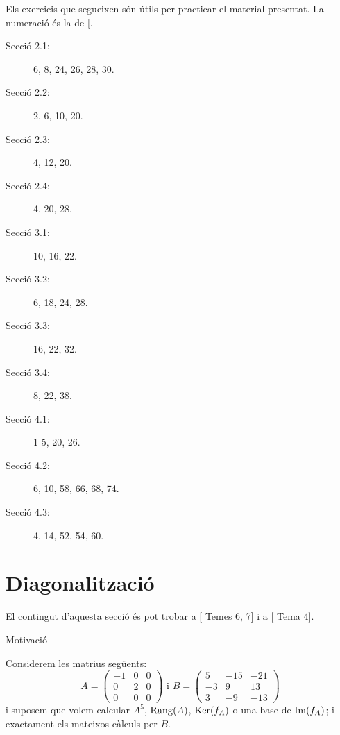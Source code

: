 \documentclass[
  11pt,
]{book}
\makeatletter
\numberwithin{dummy}{section}
\theoremstyle{maincolornumbox}
\theoremstyle{blacknumex}
\theoremstyle{blacknumbox}
\theoremstyle{maincolornum}
\renewcommand{\section}{\@startsection{section}{1}{\z@}
{-4ex \@plus -1ex \@minus -.4ex}
{1ex \@plus.2ex }
{\normalfont\large\sffamily\bfseries}}
\makeatother
\begin{document}
Els exercicis que segueixen són útils per practicar el material
presentat. La numeració és la de {[}\citeproc{ref-Bret}{1}{]}.

\begin{description}
\item[Secció 2.1:]
6, 8, 24, 26, 28, 30.
\item[Secció 2.2:]
2, 6, 10, 20.
\item[Secció 2.3:]
4, 12, 20.
\item[Secció 2.4:]
4, 20, 28.
\item[Secció 3.1:]
10, 16, 22.
\item[Secció 3.2:]
6, 18, 24, 28.
\item[Secció 3.3:]
16, 22, 32.
\item[Secció 3.4:]
8, 22, 38.
\item[Secció 4.1:]
1-5, 20, 26.
\item[Secció 4.2:]
6, 10, 58, 66, 68, 74.
\item[Secció 4.3:]
4, 14, 52, 54, 60.
\end{description}

\chapter{Diagonalització}\label{diagonalitzaciuxf3}

El contingut d'aquesta secció és pot trobar a {[} Temes 6, 7{]} i a
{[} Tema 4{]}.

\section{Motivació}\label{subsec:motiv-diag}

Considerem les matrius següents: \[A=\begin{pmatrix}
-1 & 0 & 0 \\ 0 & 2 & 0 \\ 0 & 0 & 0
\end{pmatrix}
\text{ i }
B=\begin{pmatrix}
5 & -15 & -21 \\ -3 & 9 & 13 \\ 3 & -9 & -13
\end{pmatrix}\] i suposem que volem calcular \(A^5\), \(\operatorname{Rang}(A)\),
\(\operatorname{Ker}(f_A)\) o una base de \(\operatorname{Im}(f_A)\); i exactament els mateixos càlculs
per \(B\).
\end{document}
